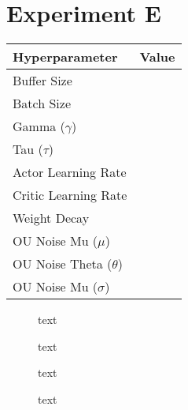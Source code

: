 \section{Experiment E}

\begin{minipage}{0.45\textwidth}
	\centering
	\begin{tabular}{lr}
	\toprule
	\textbf{Hyperparameter} & \textbf{Value} \\
	\midrule
	Buffer Size & \\
	Batch Size & \\
	Gamma ($\gamma$) & \\
	Tau ($\tau$) & \\
	Actor Learning Rate & \\
	Critic Learning Rate & \\
	Weight Decay & \\
	OU Noise Mu ($\mu$) & \\
	OU Noise Theta ($\theta$) & \\
	OU Noise Mu ($\sigma$) & \\
	\bottomrule
	\end{tabular}
\end{minipage}
\hspace{1cm}
\begin{minipage}{0.45\textwidth}
	\centering
\end{minipage}

\begin{figure}[h]
	\begin{minipage}{0.45\textwidth}
		\centering
		
		\caption{text}
		\label{fig:5501_raw_reward}
	\end{minipage}
	\hspace{0.75cm}
	\begin{minipage}{0.45\textwidth}
		\centering
		
		\caption{text}
		\label{fig:5502_average_reward}
	\end{minipage}
\end{figure}

\begin{figure}[h]
	\begin{minipage}{0.45\textwidth}
		\centering
		
		\caption{text}
		\label{fig:5503_frequency_response_1}
	\end{minipage}
	\hspace{0.75cm}
	\begin{minipage}{0.45\textwidth}
		\centering
		
		\caption{text}
		\label{fig:5504_frequency_response_2}
	\end{minipage}
\end{figure}


